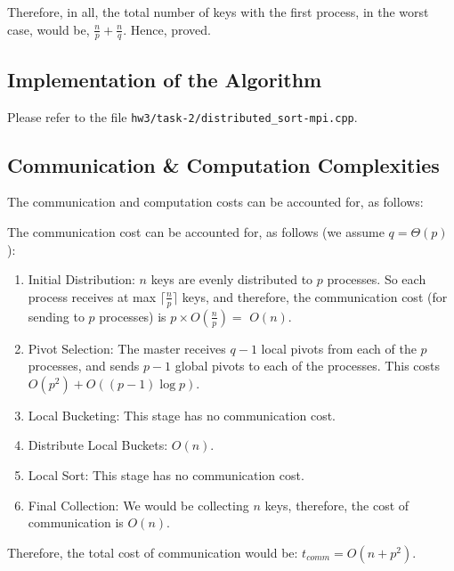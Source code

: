 \documentclass{article}
\begin{document}
Therefore, in all, the total number of keys with the first
process, in the worst case, would be, $\frac{n}{p} + \frac{n}{q}$.
Hence, proved.

\subsection{Implementation of the Algorithm}

Please refer to the file \texttt{hw3/task-2/distributed\_sort-mpi.cpp}.

\subsection{Communication \& Computation Complexities}
The communication and computation costs can be accounted for, as
follows:

The communication cost can be accounted for, as follows (we assume
$q = \Theta(p)$):
\begin{enumerate}
\item Initial Distribution: $n$ keys are evenly distributed to 
$p$ processes. So each process receives at max 
$\lceil\frac{n}{p}\rceil$ keys, and therefore, the communication 
cost  (for sending to $p$ processes) is $p \times O(\frac{n}{p}) =$
$ O(n)$.
\item Pivot Selection: The master receives $q-1$ local pivots from 
each of the $p$ processes, and sends $p-1$ global pivots to each 
of the processes. This costs $O(p^2) + O((p-1)\log{p})$.  
\item Local Bucketing: This stage has no communication cost.
\item Distribute Local Buckets: $O(n)$.
\item Local Sort: This stage has no communication cost.
\item Final Collection: We would be collecting $n$ keys, therefore,
the cost of communication is $O(n)$.
\end{enumerate}
Therefore, the total cost of communication would be: 
$t_{comm} = O(n + p^2)$.
\end{document}
